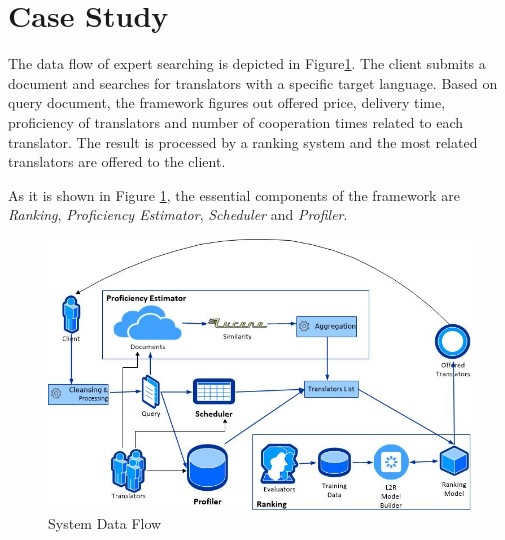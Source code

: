\section{Case Study}
\label{sec:casestudy}
The data flow of expert searching is depicted in Figure\ref{fig:architecture}. The client submits a document and searches for translators with a specific target language. Based on query document, the framework figures out offered price, delivery time, proficiency of translators and number of cooperation times related to each translator. The result is processed by a ranking system and the most related translators are offered to the client.

As it is shown in Figure \ref{fig:architecture}, the essential components of the framework are \textit{Ranking}, \textit{Proficiency Estimator}, \textit{Scheduler} and \textit{Profiler}.

\begin{figure}[h]
\begin{center}
\includegraphics[scale=0.8]{figures/dataflow.jpg}
\caption{System Data Flow
\label{fig:architecture}}
\end{center}
\end{figure}


